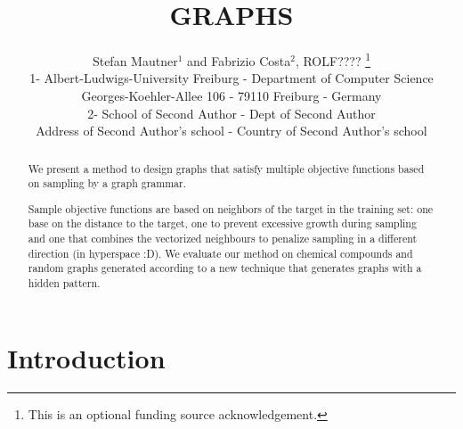 \documentclass{esannV2} \usepackage[dvips]{graphicx}
\begin{document}
 \title{GRAPHS}
\author{Stefan Mautner$^1$ and Fabrizio Costa$^2$, ROLF????
%
\thanks{This is an optional funding source acknowledgement.}
%
\vspace{.3cm}\\
%
1- Albert-Ludwigs-University Freiburg  - Department of Computer Science \\
Georges-Koehler-Allee 106  - 79110 Freiburg - Germany
\vspace{.1cm}\\ 2- School of Second Author - Dept of Second Author \\ Address
of Second Author's school - Country of Second Author's school\\ } \maketitle






\begin{abstract}

We present a method to design graphs that satisfy multiple objective functions
based on sampling by a graph grammar.

Sample objective functions are based on neighbors of the target in the
training set: one base on the distance to the target, one to prevent
excessive growth during sampling and one that combines the vectorized
neighbours to penalize sampling in a different direction (in hyperspace
:D).  We evaluate our method on chemical compounds and random graphs
generated according to a new technique that generates graphs with a hidden
pattern.

\end{abstract}

\section{Introduction}
\end{document}
